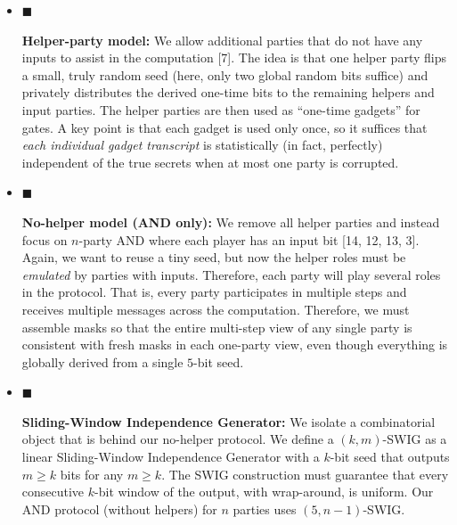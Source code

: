 \begin{itemize}


\item[] 
$\blacksquare$ 


\textbf{Helper-party model:} We allow additional parties that do not have any inputs to assist in the computation [7]. The idea is that one helper party flips a small, truly random seed (here, only two global random bits suffice) and privately distributes the derived one-time bits to the remaining helpers and input parties. The helper parties are then used as “one-time gadgets” for gates. A key point is that each gadget is used only once, so it suffices that \emph{each individual gadget transcript} is statistically (in fact, perfectly) independent of the true secrets when at most one party is corrupted.\par





\item[] 
$\blacksquare$ 


\textbf{No-helper model (AND only):} We remove all helper parties and instead focus on $n$-party AND where each player has an input bit [14, 12, 13, 3]. Again, we want to reuse a tiny seed, but now the helper roles must be \emph{emulated} by parties with inputs. Therefore, each party will play several roles in the protocol. That is, every party participates in multiple steps and receives multiple messages across the computation. Therefore, we must assemble masks so that the entire multi-step view of any single party is consistent with fresh masks in each one-party view, even though everything is globally derived from a single $5$-bit seed.\par





\item[] 
$\blacksquare$ 


\textbf{Sliding-Window Independence Generator:} We isolate a combinatorial object that is behind our no-helper protocol. We define a $(k,m)$-SWIG as a linear Sliding-Window Independence Generator with a $k$-bit seed that outputs $m\geq k$ bits for any $m\geq k$. The SWIG construction must guarantee that every consecutive $k$-bit window of the output, with wrap-around, is uniform. Our AND protocol (without helpers) for $n$ parties uses $(5,n-1)$-SWIG.\par





\end{itemize}


